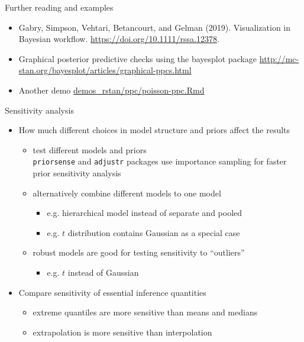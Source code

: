 \documentclass[t]{beamer}
\begin{document}
\begin{frame}{Further reading and examples}

  \begin{itemize}
  \item Gabry, Simpson, Vehtari, Betancourt, and Gelman
    (2019). Visualization in Bayesian
    workflow. \url{https://doi.org/10.1111/rssa.12378}.
  \item Graphical posterior predictive checks using the bayesplot package
    \url{http://mc-stan.org/bayesplot/articles/graphical-ppcs.html}
  \item Another demo \href{http://avehtari.github.io/BDA_R_demos/demos_rstan/ppc/poisson-ppc.html}{demos\_rstan/ppc/poisson-ppc.Rmd}
  \end{itemize}
  
\end{frame}

\begin{frame}{Sensitivity analysis}

  \begin{itemize}
  \item How much different choices in model structure and priors affect the results
    \begin{itemize}
    \item<2-> test different models and priors\\
      \texttt{priorsense} and \texttt{adjustr} packages use importance
      sampling for faster prior sensitivity analysis
      \item<3-> alternatively combine different models to one model
        \begin{itemize}
        \item e.g. hierarchical model instead of separate and pooled
        \item e.g. $t$ distribution contains Gaussian as a special case
      \end{itemize}
      \item<3-> robust models are good for testing sensitivity to ``outliers''
        \begin{itemize}
        \item e.g. $t$ instead of Gaussian
        \end{itemize}
    \end{itemize}
    \item<4-> Compare sensitivity of essential inference quantities
      \begin{itemize}
      \item extreme quantiles are more sensitive than means and medians
      \item extrapolation is more sensitive than interpolation
      \end{itemize}
    \end{itemize}

\end{frame}
\end{document}
